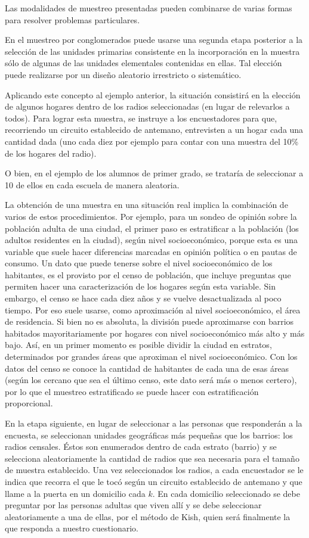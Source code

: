 \documentclass[]{article}
\begin{document}
Las modalidades de muestreo presentadas pueden combinarse de varias
formas para resolver problemas particulares.

En el muestreo por conglomerados puede usarse una segunda etapa
posterior a la selección de las unidades primarias consistente en la
incorporación en la muestra sólo de algunas de las unidades elementales
contenidas en ellas. Tal elección puede realizarse por un diseño
aleatorio irrestricto o sistemático.

Aplicando este concepto al ejemplo anterior, la situación consistirá en
la elección de algunos hogares dentro de los radios seleccionadas (en
lugar de relevarlos a todos). Para lograr esta muestra, se instruye a
los encuestadores para que, recorriendo un circuito establecido de antemano, entrevisten
a un hogar cada una cantidad dada (uno cada diez por ejemplo para contar
con una muestra del 10\% de los hogares del radio).

O bien, en el ejemplo de los alumnos de primer grado, se trataría de
seleccionar a 10 de ellos en cada escuela de manera aleatoria.

La obtención de una muestra en una situación real implica la combinación de varios de estos procedimientos. Por ejemplo, para un sondeo de
opinión sobre la población adulta de una ciudad, el primer paso es
estratificar a la población (los adultos residentes en la ciudad), según nivel socioeconómico, porque esta es una variable que suele hacer diferencias marcadas en opinión política o en pautas de consumo. Un dato que puede tenerse sobre el nivel socioeconómico de los habitantes, es el
provisto por el censo de población, que incluye preguntas que permiten
hacer una caracterización de los hogares según esta variable. Sin
embargo, el censo se hace cada diez años y se vuelve desactualizada al
poco tiempo. Por eso suele usarse, como aproximación al nivel
socioeconómico, el área de residencia. Si bien no es absoluta, la
división puede aproximarse con barrios habitados mayoritariamente por
hogares con nivel socioeconómico más alto y más bajo. Así, en un primer
momento es posible dividir la ciudad en estratos, determinados por
grandes áreas que aproximan el nivel socioeconómico. Con los datos del censo se conoce la cantidad de habitantes de cada una de esas áreas (según los cercano que sea el último censo, este dato será más o menos certero), por lo que el muestreo estratificado se puede hacer con estratificación proporcional.

En la etapa siguiente, en lugar de seleccionar a las personas que
responderán a la encuesta, se seleccionan unidades geográficas más pequeñas que los barrios: los radios censales. Éstos son enumerados dentro de cada estrato (barrio) y se selecciona aleatoriamente la cantidad de radios que sea necesaria para el tamaño de muestra establecido. Una vez seleccionados los radios, a cada encuestador se le indica que recorra el que le tocó según un circuito establecido de antemano y que llame a la puerta en un domicilio cada \(k\). En cada domicilio seleccionado se debe preguntar por las personas adultas que viven allí y se debe seleccionar aleatoriamente a una de ellas, por el método de Kish, quien será finalmente la que responda a nuestro cuestionario.
\end{document}
